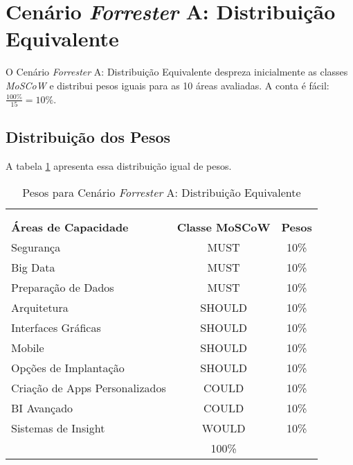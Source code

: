\newcommand{\cenFA}{Cenário \emph{Forrester} A: Distribuição Equivalente} 
\section{\cenFA}
\label{sec-cenfa}

    O \cenFA \xspace despreza inicialmente as classes \emph{MoSCoW} e distribui pesos iguais para as 10 áreas avaliadas. A conta é fácil: $\frac{100\%}{15} = 10\%$.
    
\subsection*{Distribuição dos Pesos}    

    A tabela \ref{tab:cenFA:pesos} apresenta essa distribuição igual de pesos.

\begin{table}[!h]
    \begin{center}
    \begin{tabular}{|p{}|c|c|}
        \hline
            \rowcolor{cldfB1} \multicolumn{3}{|c|}{\Large \cenFA} \\  
            \rowcolor{cldfB1}
            \multicolumn{3}{|c|}{\large \textbf{Tabela de Pesos}} \\ \hline \hline
            \rowcolor{lightgray}\textbf{Áreas de Capacidade} & \textbf{Classe MoSCoW} & \textbf{Pesos} \\ \hline
            \rowcolor{corMUST!80}Segurança & MUST & 10\% \\ \hline
            \rowcolor{corMUST!80}Big Data & MUST & 10\% \\ \hline
            \rowcolor{corMUST!80}Preparação de Dados & MUST & 10\% \\ \hline
            \rowcolor{corSHOULD!80}Arquitetura & SHOULD & 10\% \\ \hline
            \rowcolor{corSHOULD!80}Interfaces Gráficas & SHOULD & 10\% \\ \hline
            \rowcolor{corSHOULD!80}Mobile & SHOULD & 10\% \\ \hline
            \rowcolor{corSHOULD!80}Opções de Implantação & SHOULD & 10\% \\ \hline
            \rowcolor{corCOULD!50}Criação de Apps Personalizados & COULD & 10\% \\ \hline
            \rowcolor{corCOULD!50}BI Avançado & COULD & 10\% \\ \hline
            \rowcolor{corWOULD!50}Sistemas de Insight & WOULD & 10\% \\ \hline
            \rowcolor{lightgray!30} \multicolumn{2}{|r|}{\large Total: \normalsize} & 100\% \\ \hline 
    \end{tabular}    
    \caption{\label{tab:cenFA:pesos} Pesos para \cenFA}
    \end{center}
\end{table}

